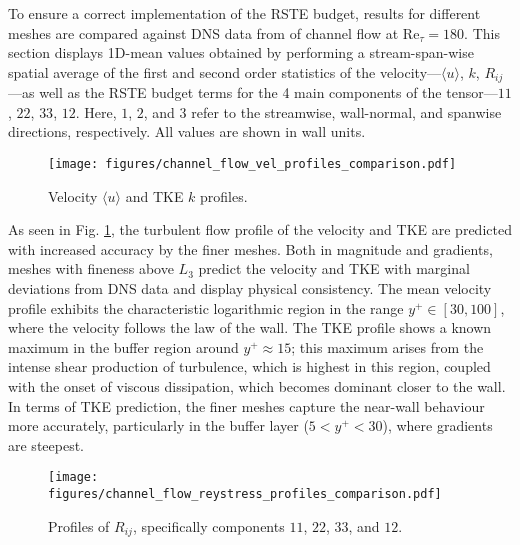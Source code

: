 To ensure a correct implementation of the RSTE budget, results for different meshes are compared against DNS data from \cite{lee2015direct} of channel flow at Re$_{\tau}=180$.
This section displays 1D-mean values obtained by performing a stream-span-wise spatial average of the first and second order statistics of the velocity---$\langle u \rangle$, $k$, $R_{ij}$---as well as the RSTE budget terms for the 4 main components of the tensor---$11$, $22$, $33$, $12$.
Here, $1$, $2$, and $3$ refer to the streamwise, wall-normal, and spanwise directions, respectively.
All values are shown in wall units.

\begin{figure}[ht]
    \centering
    \texttt{[image: figures/channel\_flow\_vel\_profiles\_comparison.pdf]}
    \caption{Velocity $\langle u \rangle$ and TKE $k$ profiles.}
    \label{fig:chan_UMean_TKE}
\end{figure}

As seen in Fig. \ref{fig:chan_UMean_TKE}, the turbulent flow profile of the velocity and TKE are predicted with increased accuracy by the finer meshes. Both in magnitude and gradients, meshes with fineness above $L_3$ predict the velocity and TKE with marginal deviations from DNS data and display physical consistency. The mean velocity profile exhibits the characteristic logarithmic region in the range $y^{+} \in [30, 100]$, where the velocity follows the law of the wall. The TKE profile shows a known maximum in the buffer region around $y^{+} \approx 15$; this maximum arises from the intense shear production of turbulence, which is highest in this region, coupled with the onset of viscous dissipation, which becomes dominant closer to the wall. In terms of TKE prediction, the finer meshes capture the near-wall behaviour more accurately, particularly in the buffer layer ($5 < y^{+} < 30$), where gradients are steepest.

\begin{figure}[ht]
    \centering
    \texttt{[image: figures/channel\_flow\_reystress\_profiles\_comparison.pdf]}
    \caption{Profiles of $R_{ij}$, specifically components $11$, $22$, $33$, and $12$.}
    \label{fig:chan_UPrime2Mean}
\end{figure}

